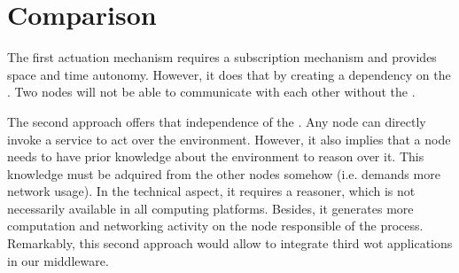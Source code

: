 
\section{Comparison}

The first actuation mechanism requires a subscription mechanism and provides space and time autonomy.
However, it does that by creating a dependency on the \space{}.
Two nodes will not be able to communicate with each other without the \space{}.


The second approach offers that independence of the \space{}.
Any node can directly invoke a service to act over the environment.
However, it also implies that a node needs to have prior knowledge about the environment to reason over it.
This knowledge must be adquired from the other nodes somehow (i.e. demands more network usage).
In the technical aspect, it requires a reasoner, which is not necessarily available in all computing platforms.
Besides, it generates more computation and networking activity on the node responsible of the process.
Remarkably, this second approach would allow to integrate third \ac{wot} applications in our middleware.



